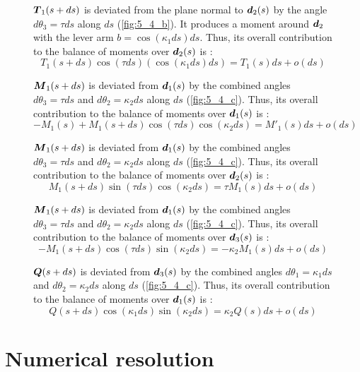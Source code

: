 \begin{figure}[p]
\begin{fullpage}
		$\boldsymbol{T}_1(s+ds)$ is deviated from the plane normal to $\boldsymbol{d}_2(s)$ by the angle $d\theta_3 = \tau ds$ along $ds$ (\cref{fig:5_4_b}). It produces a moment around $\boldsymbol{d}_2$ with the lever arm $b =  \cos(\kappa_1 ds) ds$. Thus, its overall contribution to the balance of moments over $\boldsymbol{d}_2(s)$ is : 
	\begin{equation*}
		T_1(s+ds) \cos(\tau ds) (\cos(\kappa_1 ds) ds) = T_1(s) ds + o(ds)
	\end{equation*}
	
	$\boldsymbol{M}_1(s+ds)$ is deviated from $\boldsymbol{d}_1(s)$ by the combined angles $d\theta_3 = \tau ds$ and $d\theta_2 = \kappa_2 ds$ along $ds$ (\cref{fig:5_4_c}). Thus, its overall contribution to the balance of moments over $\boldsymbol{d}_1(s)$ is : 
	\begin{equation*}
		-M_1(s) + M_1(s+ds) \cos(\tau ds) \cos(\kappa_2 ds) = M'_1 (s) ds + o(ds)
	\end{equation*}	
	
	$\boldsymbol{M}_1(s+ds)$ is deviated from $\boldsymbol{d}_1(s)$ by the combined angles $d\theta_3 = \tau ds$ and $d\theta_2 = \kappa_2 ds$ along $ds$ (\cref{fig:5_4_c}). Thus, its overall contribution to the balance of moments over $\boldsymbol{d}_2(s)$ is : 
	\begin{equation*}
		M_1(s+ds) \sin(\tau ds) \cos(\kappa_2 ds) = \tau M_1 (s) ds + o(ds)
	\end{equation*}	
	
	$\boldsymbol{M}_1(s+ds)$ is deviated from $\boldsymbol{d}_1(s)$ by the combined angles $d\theta_3 = \tau ds$ and $d\theta_2 = \kappa_2 ds$ along $ds$ (\cref{fig:5_4_c}). Thus, its overall contribution to the balance of moments over $\boldsymbol{d}_3(s)$ is : 
	\begin{equation*}
		-M_1(s+ds) \cos(\tau ds) \sin(\kappa_2 ds) = -\kappa_2 M_1 (s) ds + o(ds)
	\end{equation*}	
	
	$\boldsymbol{Q}(s+ds)$ is deviated from $\boldsymbol{d}_3(s)$ by the combined angles $d\theta_1 = \kappa_1 ds$ and $d\theta_2 = \kappa_2 ds$ along $ds$ (\cref{fig:5_4_c}). Thus, its overall contribution to the balance of moments over $\boldsymbol{d}_1(s)$ is : 
	\begin{equation*}
		Q(s+ds) \cos(\kappa_1 ds) \sin(\kappa_2 ds) = \kappa_2 Q(s) ds + o(ds)
	\end{equation*}	
	  \end{fullpage}
\end{figure}

\clearpage
\section{Numerical resolution}

